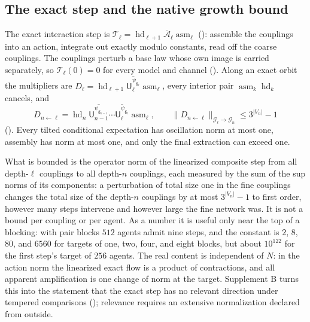 \subsection{The exact step and the native growth bound}

The exact interaction step is
$\mathcal T_\ell=\operatorname{hd}_{\ell+1}\overline{\mathcal A}_\ell\operatorname{asm}_\ell$
(): assemble the couplings into an action, integrate out exactly modulo
constants, read off the coarse couplings. The couplings perturb a base law whose own image is carried
separately, so $\mathcal T_\ell(0)=0$ for every model and channel (). Along an exact orbit the multipliers are
$D_\ell=\operatorname{hd}_{\ell+1}\overline{\mathsf U^{\psi_{\mathsf g_\ell}}_\ell}\operatorname{asm}_\ell$,
every interior pair $\operatorname{asm}_k\operatorname{hd}_k$ cancels, and
\[
D_{n\leftarrow\ell}
=\operatorname{hd}_n\overline{\mathsf U_{n-1}^{\psi_{\mathsf g_{n-1}}}}\cdots
\overline{\mathsf U_\ell^{\psi_{\mathsf g_\ell}}}\operatorname{asm}_\ell,
\qquad
\lVert D_{n\leftarrow\ell}\rVert_{\mathcal G_\ell\to\mathcal G_n}\le3^{\lvert V_n\rvert}-1
\]
(). Every tilted conditional expectation has oscillation
norm at most one, assembly has norm at most one, and only the final extraction can exceed one.

What is bounded is the operator norm of the linearized composite step from all depth-$\ell$ couplings
to all depth-$n$ couplings, each measured by the sum of the sup norms of its components: a
perturbation of total size one in the fine couplings changes the total size of the depth-$n$ couplings
by at most $3^{\lvert V_n\rvert}-1$ to first order, however many steps intervene and however large the
fine network was. It is not a bound per coupling or per agent. As a number it is useful only near the
top of a blocking: with pair blocks $512$ agents admit nine steps, and the constant is $2$, $8$, $80$,
and $6560$ for targets of one, two, four, and eight blocks, but about $10^{122}$ for the first step's
target of $256$ agents. The real content is independent of $N$: in the action norm the linearized
exact flow is a product of contractions, and all apparent amplification is one change of norm at the
target. Supplement B turns this into the statement that the exact step has no relevant direction under
tempered comparisons (); relevance requires an extensive
normalization declared from outside.

